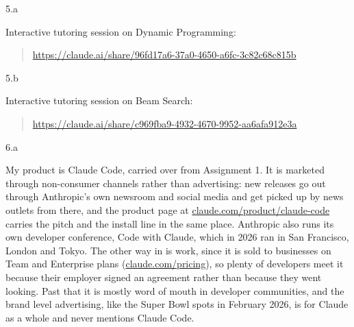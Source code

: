 \LARGE
5.a
\normalsize

\begin{answer}
  Interactive tutoring session on Dynamic Programming:

  \begin{quote}
  \href{https://claude.ai/share/96fd17a6-37a0-4650-a6fc-3c82c68c815b}{https://claude.ai/share/96fd17a6-37a0-4650-a6fc-3c82c68c815b}
  \end{quote}
\end{answer}

\LARGE
5.b
\normalsize

\begin{answer}
  Interactive tutoring session on Beam Search:

  \begin{quote}
  \href{https://claude.ai/share/c969fba9-4932-4670-9952-aa6afa912e3a}{https://claude.ai/share/c969fba9-4932-4670-9952-aa6afa912e3a}
  \end{quote}
\end{answer}

\clearpage

\LARGE
6.a
\normalsize

\begin{answer}
  My product is Claude Code, carried over from Assignment 1. It is marketed through non-consumer
  channels rather than advertising: new releases go out through Anthropic's own newsroom and social
  media and get picked up by news outlets from there, and the product page at
  \href{https://claude.com/product/claude-code}{claude.com/product/claude-code} carries the pitch
  and the install line in the same place. Anthropic also runs its own developer conference, Code
  with Claude, which in 2026 ran in San Francisco, London and Tokyo. The other way in is work, since
  it is sold to businesses on Team and Enterprise plans
  (\href{https://claude.com/pricing}{claude.com/pricing}), so plenty of developers meet it because
  their employer signed an agreement rather than because they went looking. Past that it is mostly
  word of mouth in developer communities, and the brand level advertising, like the Super Bowl spots
  in February 2026, is for Claude as a whole and never mentions Claude Code.
\end{answer}

